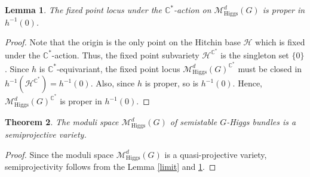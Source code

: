 \documentclass[11pt, reqno]{amsart}
\numberwithin{equation}{section}
\newtheorem{theorem}{Theorem}[section]
\newtheorem{lemma}[theorem]{Lemma}
\theoremstyle{definition}
\begin{document}
\begin{lemma}\label{fixed}
The fixed point locus under the $\mathbb{C}^*$-action on $\mathcal{M}^d_{\mathrm{Higgs}}(G)$ is proper in $h^{-1}(0)$.
\end{lemma}
\begin{proof}
Note that the origin is the only point on the Hitchin base $\mathcal{H}$ which is fixed under the $\mathbb{C}^*$-action. Thus, the fixed point subvariety $\mathcal{H}^{\mathbb{C}^*}$ is the singleton set $\{0\}$. Since $h$ is $\mathbb{C}^*$-equivariant, the fixed point locus $\mathcal{M}^d_{\mathrm{Higgs}}(G)^{\mathbb{C}^*}$ must be closed in $h^{-1}(\mathcal{H}^{\mathbb{C}^*}) = h^{-1}(0)$. Also, since $h$ is proper, so is $h^{-1}(0)$. Hence, $\mathcal{M}^d_{\mathrm{Higgs}}(G)^{\mathbb{C}^*}$ is proper in $h^{-1}(0)$.
\end{proof}
\begin{theorem}\label{Higgs}
The moduli space $\mathcal{M}^d_{\mathrm{Higgs}}(G)$ of semistable $G$-Higgs bundles is a semiprojective variety.
\end{theorem}
\begin{proof}
Since the moduli space $\mathcal{M}^d_{\mathrm{Higgs}}(G)$ is a quasi-projective variety, semiprojectivity follows from the Lemma \ref{limit} and \ref{fixed}.
\end{proof}
\end{document}
